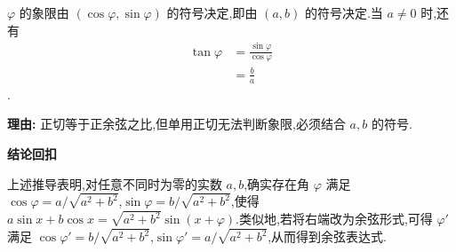 \begin{proofbox}
\begin{description}[style=nextline, leftmargin=2.8em, labelsep=0.5em, itemsep=0.55em]
		\item[\textbf{步骤六(象限与正切):}] $\varphi$ 的象限由 $(\cos\varphi,\sin\varphi)$ 的符号决定,即由 $(a,b)$ 的符号决定.当 $a\neq0$ 时,还有
			\[
				\begin{aligned}
					\tan\varphi &= \frac{\sin\varphi}{\cos\varphi} \\
					&= \frac{b}{a}
			\end{aligned}
			\].
			\par\textbf{理由:} 正切等于正余弦之比,但单用正切无法判断象限,必须结合 $a,b$ 的符号.
	\end{description}

	\medskip
	\textbf{\textcolor{CProof}{结论回扣}}

	上述推导表明,对任意不同时为零的实数 $a,b$,确实存在角 $\varphi$ 满足 $\cos\varphi = a/\sqrt{a^{2}+b^{2}}$,$\sin\varphi = b/\sqrt{a^{2}+b^{2}}$,使得 $a\sin x + b\cos x = \sqrt{a^{2}+b^{2}}\sin(x+\varphi)$.类似地,若将右端改为余弦形式,可得 $\varphi'$ 满足 $\cos\varphi' = b/\sqrt{a^{2}+b^{2}}$,$\sin\varphi' = a/\sqrt{a^{2}+b^{2}}$,从而得到余弦表达式.
\end{proofbox}
